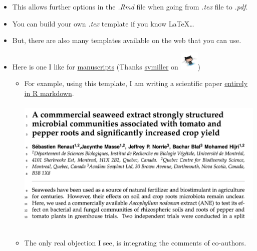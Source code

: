 \documentclass[]{article}
\begin{document}
\begin{itemize}
\item
  This allows further options in the \emph{.Rmd} file when going from
  \emph{.tex} file to \emph{.pdf}.
\item
  You can build your own \emph{.tex} template if you know LaTeX\ldots{}
\item
  But, there are also many templates available on the web that you can
  use.
\item
  Here is one I like for
  \href{https://github.com/svmiller/svm-r-markdown-templates/blob/master/svm-latex-ms.tex}{manuscripts}
  (Thanks \href{https://github.com/svmiller}{svmiller} on
  \includegraphics[width=0.35417in,height=\textheight]{../figures/octocat.png})

  \begin{itemize}
  \item
    For example, using this template, I am writing a scientific paper
    \href{https://github.com/seb951/Acadian_seaplants/blob/master/manuscript_Rmd/Acadian_seaplants_v5.pdf}{entirely
    in R markdown}.\\
    \hspace*{0.333em}\\
    \includegraphics[width=5.20833in,height=\textheight]{../figures/acadian.png}\\
    \hspace*{0.333em}\\
    \hspace*{0.333em}
  \item
    The only real objection I see, is integrating the comments of
    co-authors.
  \end{itemize}
\end{itemize}
\end{document}
